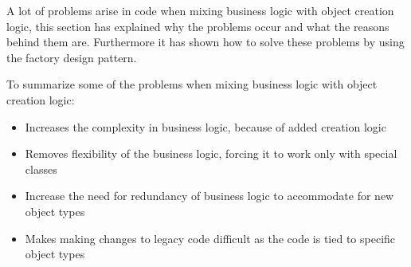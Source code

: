 A lot of problems arise in code when mixing business logic with object
creation logic, this section has explained why the problems occur
and what the reasons behind them are. Furthermore it has shown how
to solve these problems by using the factory design pattern. 

To summarize some of the problems when mixing business logic with
object creation logic:
\begin{itemize}
\item Increases the complexity in business logic, because of added creation
logic
\item Removes flexibility of the business logic, forcing it to work only
with special classes
\item Increase the need for redundancy of business logic to accommodate
for new object types
\item Makes making changes to legacy code difficult as the code is tied
to specific object types\end{itemize}

